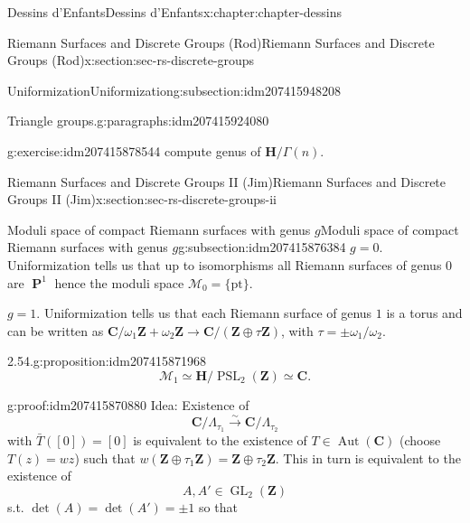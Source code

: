 \documentclass[oneside,10pt,]{book}
\numberwithin{equation}{section}
\newcommand{\lb}{[}
\newcommand{\rb}{]}
\newcommand{\ZZ}{\mathbf{Z}}
\newcommand{\CC}{\mathbf{C}}
\newcommand{\HH}{\mathbf{H}}
\DeclareMathOperator{\PP}{\mathbf{P}}
\DeclareMathOperator{\Aut}{Aut}
\DeclareMathOperator{\GL}{GL}
\DeclareMathOperator{\PSL}{PSL}
\begin{document}
\begin{chapterptx}{Dessins d'Enfants}{}{Dessins d'Enfants}{}{}{x:chapter:chapter-dessins}
\begin{sectionptx}{Riemann Surfaces and Discrete Groups (Rod)}{}{Riemann Surfaces and Discrete Groups (Rod)}{}{}{x:section:sec-rs-discrete-groups}
\begin{subsectionptx}{Uniformization}{}{Uniformization}{}{}{g:subsection:idm207415948208}
\begin{paragraphs}{Triangle groups.}{g:paragraphs:idm207415924080}
\begin{inlineexercise}{}{g:exercise:idm207415878544}
compute genus of \(\HH/\Gamma(n)\).%
\end{inlineexercise}
\end{paragraphs}%
\end{subsectionptx}
\end{sectionptx}
%
%
\typeout{************************************************}
\typeout{************************************************}
%
\begin{sectionptx}{Riemann Surfaces and Discrete Groups II (Jim)}{}{Riemann Surfaces and Discrete Groups II (Jim)}{}{}{x:section:sec-rs-discrete-groups-ii}
%
%
\typeout{************************************************}
\typeout{************************************************}
%
\begin{subsectionptx}{Moduli space of compact Riemann surfaces with genus \(g\)}{}{Moduli space of compact Riemann surfaces with genus \(g\)}{}{}{g:subsection:idm207415876384}
\(g =0\). Uniformization tells us that up to isomorphisms all Riemann surfaces of genus \(0\) are \(\PP^1\) hence the moduli space \(\mathcal M _0  = \{\text{pt}\}\).%
\par
\(g = 1\). Uniformization tells us that each Riemann surface of genus \(1\) is a torus and can be written as \(\CC/ \omega_1\ZZ+ \omega_2\ZZ \to \CC/(\ZZ \oplus \tau \ZZ)\), with \(\tau = \pm \omega_1/\omega_2\).%
\begin{proposition}{2.54.}{}{g:proposition:idm207415871968}%
%
\begin{equation*}
\mathcal M_1 \simeq \HH/ \PSL_2(\ZZ) \simeq \CC\text{.}
\end{equation*}
%
\end{proposition}
\begin{proofptx}{}{g:proof:idm207415870880}
Idea: Existence of%
\begin{equation*}
\CC/ \Lambda_{\tau_1} \xrightarrow{\sim} \CC/\Lambda_{\tau_2}
\end{equation*}
with \(\bar T (\lb 0 \rb) = \lb 0 \rb\) is equivalent to the existence of \(T \in \Aut(\CC)\) (choose \(T(z) = wz\)) such that \(w(\ZZ\oplus \tau_1 \ZZ) = \ZZ\oplus \tau_2\ZZ\). This in turn is equivalent to the existence of%
\begin{equation*}
A,A' \in \GL_2(\ZZ)
\end{equation*}
s.t. \(\det (A) = \det(A') = \pm 1\) so that%
\begin{equation*}

\end{equation*}
\end{proofptx}
\end{subsectionptx}
\end{sectionptx}
\end{chapterptx}
\end{document}
